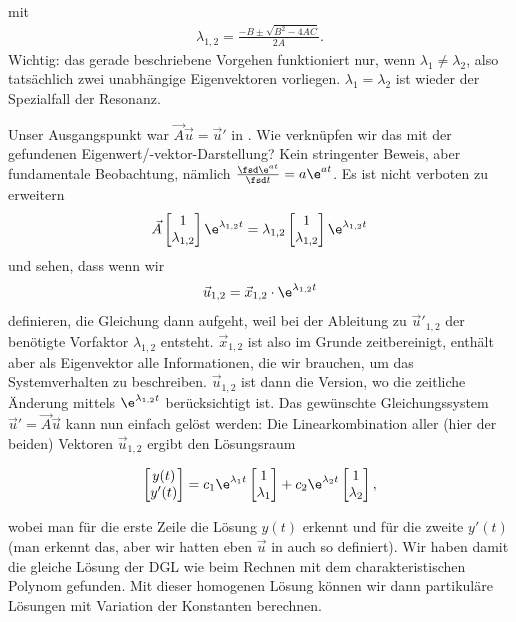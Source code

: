 %
mit
\begin{align}
\lambda_{1,2} = \frac{-B \pm \sqrt{B^2-4 A C}}{2 A}.
\end{align}
%
Wichtig: das gerade beschriebene Vorgehen funktioniert nur, wenn
$\lambda_1 \neq \lambda_2$, also tatsächlich zwei unabhängige Eigenvektoren vorliegen.
%
$\lambda_1 = \lambda_2$ ist wieder der Spezialfall der Resonanz.

Unser Ausgangspunkt war $\vec{A}  \vec{u} = \vec{u}'$ in .
Wie verknüpfen wir das mit der gefundenen Eigenwert/-vektor-Darstellung?
%
Kein stringenter Beweis, aber fundamentale Beobachtung, nämlich
$\frac{\fsd \e^{a t}}{\fsd t} = a \e^{a t}$.
%
Es ist nicht verboten zu erweitern
\begin{align}
\vec{A}
\begin{bmatrix}
1 \\ \lambda_{1,2}
\end{bmatrix}
\e^{\lambda_{1,2} t}
= \lambda_{1,2}
\begin{bmatrix}
1 \\ \lambda_{1,2}
\end{bmatrix}
\e^{\lambda_{1,2} t}
\end{align}
und sehen, dass wenn wir
\begin{align}
\vec{u}_{1,2} = \vec{x}_{1,2} \cdot \e^{\lambda_{1,2} t}
\end{align}
definieren, die Gleichung  dann aufgeht, weil bei der Ableitung zu
$\vec{u}'_{1,2}$ der benötigte Vorfaktor $\lambda_{1,2}$ entsteht.
%
$\vec{x}_{1,2}$ ist also im Grunde zeitbereinigt, enthält aber als Eigenvektor
alle Informationen, die wir brauchen, um das Systemverhalten zu beschreiben.
%
$\vec{u}_{1,2}$ ist dann die Version, wo die zeitliche Änderung mittels
$\e^{\lambda_{1,2} t}$ berücksichtigt ist.
%
Das gewünschte Gleichungssystem $\vec{u}'=\vec{A}  \vec{u}$ kann nun einfach
gelöst werden:
%
Die Linearkombination aller (hier der beiden) Vektoren $\vec{u}_{1,2}$ ergibt den
Lösungsraum
\begin{mdframed}[backgroundcolor=C3!10]
\begin{align}
\begin{bmatrix}
y(t) \\ y'(t)
\end{bmatrix} =
c_1 \e^{\lambda_1 t}
\begin{bmatrix}
1 \\ \lambda_{1}
\end{bmatrix}
+
c_2 \e^{\lambda_2 t}
\begin{bmatrix}
1 \\ \lambda_{2}
\end{bmatrix},
\end{align}
\end{mdframed}
%
wobei man für die erste Zeile die Lösung $y(t)$ erkennt und für die zweite $y'(t)$
(man erkennt das, aber wir hatten eben $\vec{u}$ in 
auch so definiert).
%
Wir haben damit die gleiche Lösung der DGL wie beim Rechnen mit dem
charakteristischen Polynom gefunden.
%
Mit dieser homogenen Lösung können wir dann partikuläre Lösungen mit
Variation der Konstanten berechnen.

